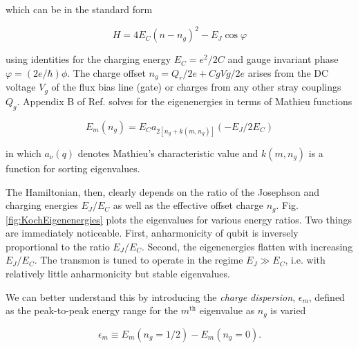 \documentclass[11 pt, oneside]{book} %
\begin{document}
which can be in the standard form

\begin{equation}\label{eq:TransmonHamiltonian}
H=4E_C(n-n_g)^2-E_J\cos\varphi
\end{equation}

using identities for the charging energy $E_C=e^2/2C$ and gauge invariant phase $\varphi=(2e/\hbar)\phi$. The charge offset $n_g=Q_r/2e+CgVg/2e$ arises from the DC voltage $V_g$ of the flux bias line (gate) or charges from any other stray couplings $Q_g$. Appendix B of Ref. \cite{Koch}  solves for the eigenenergies in terms of Mathieu functions

\begin{equation}
E_m(n_g)=E_C a_{2[n_g+k(m,n_g)]}(-E_J/2E_C)
\end{equation}

in which $a_\nu(q)$ denotes Mathieu's characteristic value and $k(m, n_g)$ is a function for sorting eigenvalues. 


The Hamiltonian, then, clearly depends on the ratio of the Josephson and charging energies $E_J/E_C$ as well as the effective offset charge $n_g$. Fig. \ref{fig:KochEigenenergies} plots the eigenvalues for various energy ratios. Two things are immediately noticeable. First, anharmonicity of qubit is inversely proportional to the ratio $E_J/E_C$. Second, the eigenenergies flatten with increasing $E_J/E_C$. The transmon is tuned to operate in the regime $E_J\gg E_C$, i.e. with relatively little anharmonicity but stable eigenvalues. 

We can better understand this by introducing the \emph{charge dispersion}, $\epsilon_m$, defined as the peak-to-peak energy range for the $m^{\mathrm{th}}$ eigenvalue as $n_g$ is varied

\begin{equation}\label{eq:ChargeDispersion}
\epsilon_m \equiv E_m(n_g=1/2)-E_m(n_g=0).
\end{equation}
\end{document}
